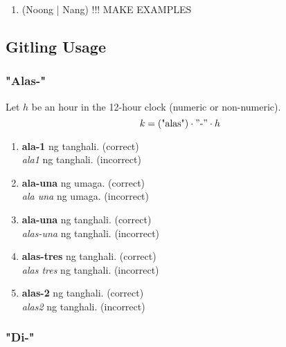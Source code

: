 \begin{enumerate}
      \item (Noong | Nang) !!! MAKE EXAMPLES
\end{enumerate}

\subsection{Gitling Usage}

\subsubsection{"Alas-"}
Let \(h\) be an hour in the 12-hour clock (numeric or non-numeric).
\[
      k = (\text{"alas"}) \cdot "\text{-}" \cdot h
\]
\begin{example}
\end{example}
\begin{enumerate}
      \item \textbf{ala-1} ng tanghali. (correct) \\
            \textit{ala1} ng tanghali. (incorrect)
      \item \textbf{ala-una} ng umaga. (correct) \\
            \textit{ala una} ng umaga. (incorrect)
      \item \textbf{ala-una} ng tanghali. (correct) \\
            \textit{alas-una} ng tanghali. (incorrect)
      \item \textbf{alas-tres} ng tanghali. (correct) \\
            \textit{alas tres} ng tanghali. (incorrect)
      \item \textbf{alas-2} ng tanghali. (correct) \\
            \textit{alas2} ng tanghali. (incorrect)
\end{enumerate}

\subsubsection{"Di-"}

